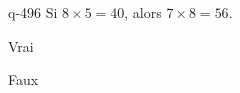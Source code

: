 \begin{truefalse}{q-496}
Si $8\times 5 = 40$, alors $7\times 8 = 56$.
\item* Vrai
\item Faux
\end{truefalse}

